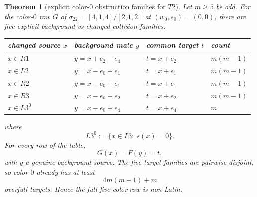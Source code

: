 \documentclass[11pt]{article}
\newtheorem{theorem}{Theorem}
\newcommand{\eX}{e_0}
\newcommand{\eQ}{e_1}
\newcommand{\eW}{e_2}
\newcommand{\eU}{e_4}
\begin{document}
\begin{theorem}[explicit color-$0$ obstruction families for $T2$]
\label{thm:T2-families}
Let $m\ge 5$ be odd.
For the color-$0$ row $G$ of $\sigma_{22}=[4,1,4]/[2,1,2]$ at $(w_0,s_0)=(0,0)$,
there are five explicit background-vs-changed collision families:
\begin{center}
\begin{tabular}{@{}llll@{}}
\toprule
changed source $x$ & background mate $y$ & common target $t$ & count \\
\midrule
$x\in R1$ & $y=x+\eW-\eU$ & $t=x+\eW$ & $m(m-1)$ \\
$x\in L2$ & $y=x-\eX+\eQ$ & $t=x+\eQ$ & $m(m-1)$ \\
$x\in R2$ & $y=x-\eX+\eQ$ & $t=x+\eQ$ & $m(m-1)$ \\
$x\in R3$ & $y=x-\eX+\eW$ & $t=x+\eW$ & $m(m-1)$ \\
$x\in L3^0$ & $y=x-\eX+\eU$ & $t=x+\eU$ & $m$ \\
\bottomrule
\end{tabular}
\end{center}
where
\[
L3^0:=\{x\in L3:\ s(x)=0\}.
\]
For every row of the table,
\[
G(x)=F(y)=t,
\]
with $y$ a genuine background source.
The five target families are pairwise disjoint, so color $0$ already has at least
\[
4m(m-1)+m
\]
overfull targets.
Hence the full five-color row is non-Latin.
\end{theorem}
\end{document}
